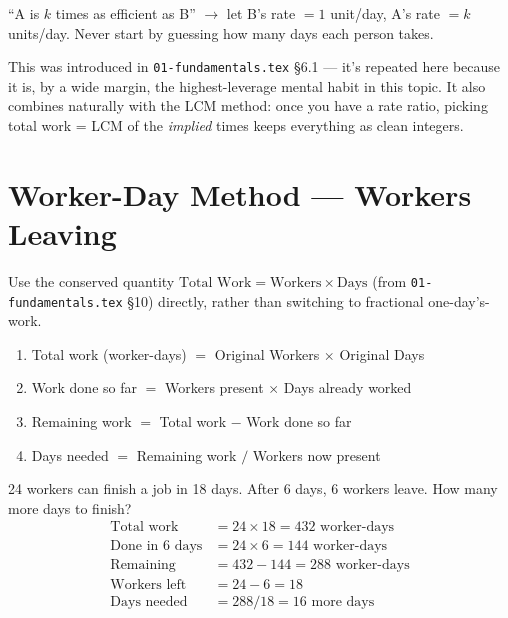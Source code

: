 \documentclass[11pt]{article}
\begin{document}
\begin{formulabox}[Rule]
``A is $k$ times as efficient as B'' $\to$ let B's rate $= 1$ unit/day, A's rate $= k$ units/day.
Never start by guessing how many days each person takes.
\end{formulabox}

This was introduced in \texttt{01-fundamentals.tex} \S6.1 --- it's repeated here because it is, by a
wide margin, the highest-leverage mental habit in this topic. It also combines naturally with the LCM
method: once you have a rate ratio, picking total work = LCM of the \emph{implied} times keeps
everything as clean integers.

\section{Worker-Day Method --- Workers Leaving}
Use the conserved quantity $\text{Total Work} = \text{Workers} \times \text{Days}$ (from
\texttt{01-fundamentals.tex} \S10) directly, rather than switching to fractional one-day's-work.

\begin{formulabox}[Procedure]
\begin{enumerate}[leftmargin=1.4em]
  \item Total work (worker-days) $=$ Original Workers $\times$ Original Days
  \item Work done so far $=$ Workers present $\times$ Days already worked
  \item Remaining work $=$ Total work $-$ Work done so far
  \item Days needed $=$ Remaining work $/$ Workers now present
\end{enumerate}
\end{formulabox}

\begin{examplebox}
24 workers can finish a job in 18 days. After 6 days, 6 workers leave. How many more days to finish?
\begin{align*}
\text{Total work} &= 24 \times 18 = 432 \text{ worker-days} \\
\text{Done in 6 days} &= 24 \times 6 = 144 \text{ worker-days} \\
\text{Remaining} &= 432 - 144 = 288 \text{ worker-days} \\
\text{Workers left} &= 24 - 6 = 18 \\
\text{Days needed} &= 288/18 = 16 \text{ more days}
\end{align*}
\end{examplebox}
\end{document}
